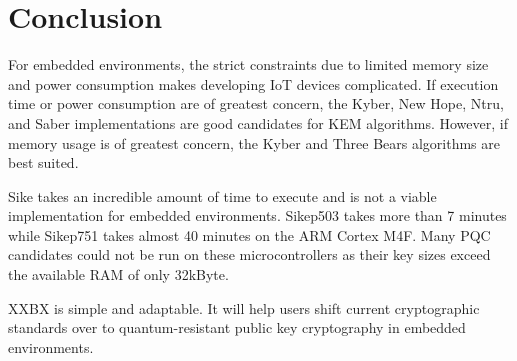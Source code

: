 \documentclass[10pt]{article}
\begin{document}
\section{Conclusion}

For embedded environments, the strict constraints due to limited memory size and power 
consumption makes developing IoT devices complicated. If execution time or power consumption 
are of greatest concern, the Kyber, New Hope, Ntru, and Saber implementations are good candidates 
for KEM algorithms. However, if memory usage is of greatest concern, the Kyber and Three Bears algorithms
are best suited.

Sike takes an incredible amount of time to execute and is not a viable implementation for 
embedded environments. Sikep503 takes more than 7 minutes while Sikep751 takes almost 40 minutes on the ARM Cortex M4F. 
Many PQC candidates could not be run on these microcontrollers as their key sizes exceed the
available RAM of only 32kByte.

XXBX is simple and adaptable. It will help users shift current cryptographic standards over 
to quantum-resistant public key cryptography in embedded environments.




\end{document}

